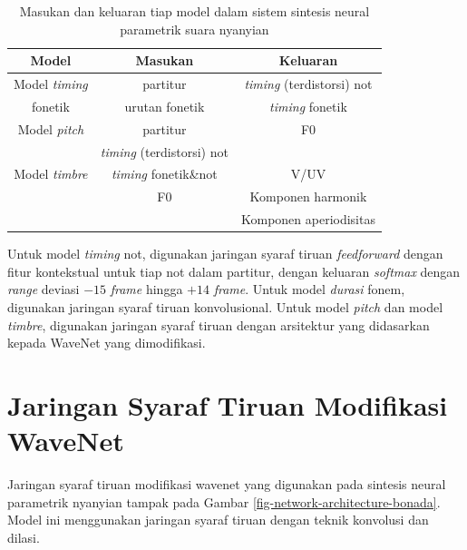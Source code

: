 \begin{table}[h]
	\centering
    \caption{Masukan dan keluaran tiap model dalam sistem sintesis neural parametrik suara nyanyian \parencite{bonada2017singing}}\label{tab-models-in-out-bonada}
	\begin{tabular}{ |c|c|c| } 
	 \hline
	 Model & Masukan & Keluaran \\
	 \hline 
	 Model \textit{timing} & partitur & \textit{timing} (terdistorsi) not \\ 
	 fonetik  & urutan fonetik & \textit{timing} fonetik \\ 
	 \hline
	 Model \textit{pitch} & partitur & F0 \\ 
	  & \textit{timing} (terdistorsi) not  & \\ 
	 \hline
	 Model \textit{timbre} &  \textit{timing} fonetik\&not & V/UV \\ 
	  & F0 & Komponen harmonik\\ 
	  &   & Komponen aperiodisitas\\ 
	 \hline
	\end{tabular}
\end{table}

Untuk model \textit{timing} not, digunakan jaringan syaraf tiruan \textit{feedforward} dengan fitur kontekstual untuk tiap not dalam partitur, dengan keluaran \textit{softmax} dengan \textit{range} deviasi $-15$ \textit{frame} hingga $+14$ \textit{frame}. Untuk model \textit{durasi} fonem, digunakan jaringan syaraf tiruan konvolusional. \parencite{bonada2017singing} Untuk model \textit{pitch} dan model \textit{timbre}, digunakan jaringan syaraf tiruan dengan arsitektur yang didasarkan kepada WaveNet \parencite{Oord2016WaveNetAG} yang dimodifikasi.

\section{Jaringan Syaraf Tiruan Modifikasi WaveNet}

Jaringan syaraf tiruan modifikasi wavenet yang digunakan pada sintesis neural parametrik nyanyian tampak pada Gambar \ref{fig-network-architecture-bonada}. \parencite{bonada2017singing} Model ini menggunakan jaringan syaraf tiruan dengan teknik konvolusi dan dilasi.

